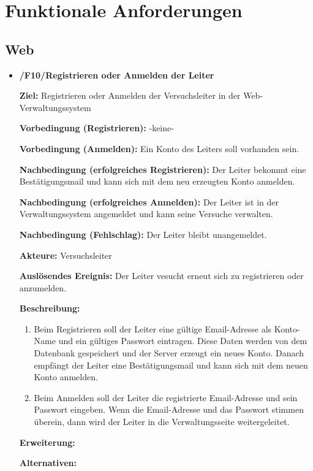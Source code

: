 \documentclass[a4paper]{scrreprt}
\begin{document}
    \chapter{Funktionale Anforderungen}

		\section{Web}
	        \begin{itemize}
	            \item \textbf{/F10/Registrieren oder Anmelden der Leiter}
		
	            	\par \textbf{Ziel: }Registrieren oder Anmelden der Versuchsleiter in der Web-Verwaltungssystem
	            	\par \textbf{Vorbedingung (Registrieren): }-keine-
	            	\par \textbf{Vorbedingung (Anmelden): }Ein Konto des Leiters soll vorhanden sein.
	            	\par \textbf{Nachbedingung (erfolgreiches Registrieren): }Der Leiter bekommt eine Bestätigungsmail und kann sich mit dem neu erzeugten Konto anmelden.
	            	\par \textbf{Nachbedingung (erfolgreiches Anmelden): }Der Leiter ist in der Verwaltungssystem angemeldet und kann seine Versuche verwalten.
	            	\par \textbf{Nachbedingung (Fehlschlag): }Der Leiter bleibt unangemeldet.
	            	\par \textbf{Akteure: }Versuchsleiter
	            	\par \textbf{Auslösendes Ereignis: }Der Leiter vesucht erneut sich zu registrieren oder anzumelden.
	            	\par \textbf{Beschreibung: }
		            	\begin{enumerate}
		            		\item Beim Registrieren soll der Leiter eine gültige Email-Adresse als Konto-Name und ein gültiges Passwort eintragen. Diese Daten werden von dem Datenbank gespeichert und der Server erzeugt ein neues Konto. Danach empfängt der Leiter eine Bestätigungsmail und kann sich mit dem neuen Konto anmelden.
			            	\item Beim Anmelden soll der Leiter die registrierte Email-Adresse und sein Passwort eingeben. Wenn die Email-Adresse und das Passwort stimmen überein, dann wird der Leiter in die Verwaltungsseite weitergeleitet.
		            	\end{enumerate}
	            	\par \textbf{Erweiterung: }
	            	\par \textbf{Alternativen: }
	            	

\end{itemize}
\end{document}
